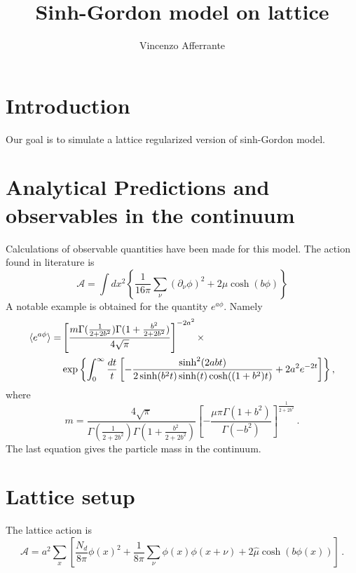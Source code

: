 \documentclass[12pt]{report}
\begin{document}
 

 
\title{Sinh-Gordon model on lattice}
\author{Vincenzo Afferrante} 
 
\maketitle

\chapter{Introduction} 

Our goal is to simulate  a lattice regularized version of sinh-Gordon model.

\chapter{Analytical Predictions and observables in the continuum }

Calculations of observable quantities have been made for this model. The action found in literature is \begin{equation}
\mathcal{A} = \int dx^2 \left\lbrace\dfrac{1}{16 \pi} \sum_\nu (\partial_\nu \phi )^2 + 2 \mu \cosh(b \phi) \right\rbrace
\end{equation}  A notable example is obtained for the quantity $e^{a\phi}$. Namely
\begin{align}
\braket{e^{a \phi}} =  &\left[ \dfrac{m\Gamma(\frac{1}{2+2b^2}) \Gamma(1+ \frac{b^2}{2+2b^2}) }{4 \sqrt{\pi}}  \right]^{-2 a^2} \times \nonumber \\ & \exp{\left\lbrace \int_0^\infty \dfrac{dt}{t} \left[ - \dfrac{\sinh^2(2 a b t)}{2 \sinh(b^2t) \sinh(t)\cosh((1+b^2)t) } + 2 a^2 e^{-2t} \right]  \right\rbrace } \,,
\end{align} where \begin{equation}
m = \dfrac{4 \sqrt{\pi}}{\Gamma(\frac{1}{2+2b^2})\Gamma(1 +\frac{b^2}{2+2b^2}) } \left[ - \dfrac{\mu \pi \Gamma(1+b^2)}{\Gamma(-b^2)} \right]^{\frac{1}{2+2b^2}} \,.
\end{equation} The last equation gives the particle mass in the continuum. 

\chapter{Lattice setup}

The lattice action is \begin{equation}
\mathcal{A} = a^2 \sum_x \left[ \dfrac{N_d}{8 \pi} \phi(x)^2 + \dfrac{1}{8\pi} \sum_\nu \phi(x) \phi(x+\nu) +2 \hat \mu \cosh(b\phi(x)) \right] \,.
\end{equation} 
\end{document}
